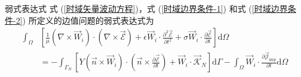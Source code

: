 \begin{theorem}{弱式表达式}
    式 (\ref{时域矢量波动方程})，式 (\ref{时域边界条件-1}) 和式
    (\ref{时域边界条件-2}) 所定义的边值问题的弱式表达式为
    \begin{equation}
        \begin{aligned}
            \int_{\Omega}&\left[
                \frac{1}{\mu}
                (\nabla\times\vec{W}_i)\cdot(\nabla\times\vec{\mathscr{E}})
                +\epsilon\vec{W}_i\cdot\frac{\partial^2\vec{\mathscr{E}}}{\partial t^2}
                +\sigma\vec{W}_i\cdot\frac{\partial\vec{\mathscr{E}}}{\partial t}
            \right]\text{d}\Omega\\
            &=
            -\int_{\Gamma_N}\left[
                Y(\vec{n}\times\vec{W}_i)\cdot
                \left(
                    \vec{n}\times\frac{\partial\vec{\mathscr{E}}}{\partial t}
                \right)
                +\vec{W}_i\cdot\vec{\mathscr{K}}_N
            \right]\text{d}\Gamma
            -\int_{\Omega}\vec{W}_i\cdot
            \frac{\partial\vec{\mathscr{J}}_{\text{imp}}}{\partial t}\text{d}\Omega
        \end{aligned}
    \end{equation}
\end{theorem}

